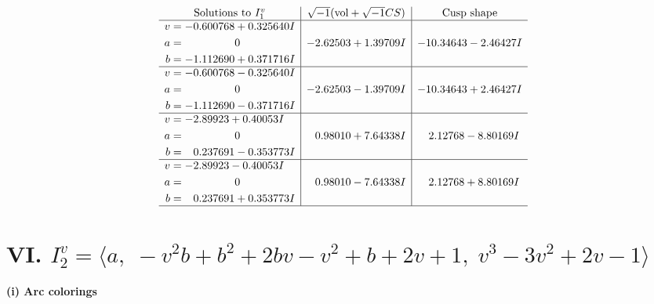 \documentclass[1p]{elsarticle_modified}
\theoremstyle{definition}
\newcommand{\I}{\sqrt{-1}}
\begin{document}
$$\begin{array}{c|c|c}  
\text{Solutions to }I^v_{1}& \I (\text{vol} + \sqrt{-1}CS) & \text{Cusp shape}\\
 \hline 
\begin{aligned}
v &= -0.600768 + 0.325640 I \\
a &= \phantom{-0.000000 } 0 \\
b &= -1.112690 + 0.371716 I\end{aligned}
 & -2.62503 + 1.39709 I & -10.34643 - 2.46427 I \\ \hline\begin{aligned}
v &= -0.600768 - 0.325640 I \\
a &= \phantom{-0.000000 } 0 \\
b &= -1.112690 - 0.371716 I\end{aligned}
 & -2.62503 - 1.39709 I & -10.34643 + 2.46427 I \\ \hline\begin{aligned}
v &= -2.89923 + 0.40053 I \\
a &= \phantom{-0.000000 } 0 \\
b &= \phantom{-}0.237691 - 0.353773 I\end{aligned}
 & \phantom{-}0.98010 + 7.64338 I & \phantom{-}2.12768 - 8.80169 I \\ \hline\begin{aligned}
v &= -2.89923 - 0.40053 I \\
a &= \phantom{-0.000000 } 0 \\
b &= \phantom{-}0.237691 + 0.353773 I\end{aligned}
 & \phantom{-}0.98010 - 7.64338 I & \phantom{-}2.12768 + 8.80169 I\\
 \hline 
 \end{array}$$\newpage\newpage\renewcommand{\arraystretch}{1}
\centering \section*{VI. $I^v_{2}= \langle a,\;- v^2 b+b^2+2 b v- v^2+b+2 v+1,\;v^3-3 v^2+2 v-1 \rangle$}
\flushleft \textbf{(i) Arc colorings}\\
\end{document}
